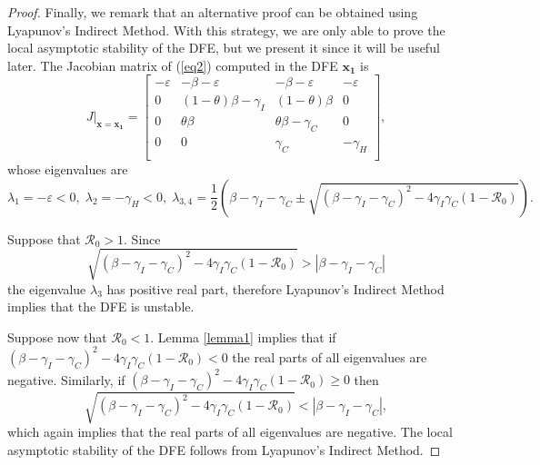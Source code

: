 \documentclass[11pt,reqno]{amsart}
\theoremstyle{boldremark}
\begin{document}
\begin{proof}
    Finally, we remark that an alternative proof can be obtained using Lyapunov's Indirect Method. With this strategy, we are only able to prove the local asymptotic stability of the DFE, but we present it since it will be useful later. The Jacobian matrix of (\ref{eq2}) computed in the DFE $\mathbf{x_1}$ is 
    \begin{equation*}
        J|_{\mathbf{x}=\mathbf{x_1}} = 
        \begin{bmatrix}
            -\varepsilon & -\beta-\varepsilon & -\beta-\varepsilon & -\varepsilon \\ 
            0 & (1-\theta)\beta-\gamma_I & (1-\theta)\beta & 0 \\ 
            0 & \theta \beta & \theta \beta - \gamma_C & 0 \\ 
            0 & 0 & \gamma_C & -\gamma_H \\ 
        \end{bmatrix},
    \end{equation*}
    whose eigenvalues are 
    \begin{equation*}
        \lambda_1 = -\varepsilon < 0, \; \lambda_2=-\gamma_H < 0, \; \lambda_{3,4} = \frac{1}{2} \left(\beta-\gamma_I-\gamma_C \pm \sqrt{(\beta-\gamma_I-\gamma_C)^2-4 \gamma_I \gamma_C(1-\mathcal{R}_0)}\right). 
    \end{equation*} 
    
    Suppose that $\mathcal{R}_0>1$. Since 
    \begin{equation*}
        \sqrt{(\beta-\gamma_I-\gamma_C)^2-4 \gamma_I \gamma_C(1-\mathcal{R}_0)} > |\beta-\gamma_I-\gamma_C|
    \end{equation*}
    the eigenvalue $\lambda_3$ has positive real part, therefore Lyapunov's Indirect Method implies that the DFE is unstable. 

    Suppose now that $\mathcal{R}_0<1$. Lemma \ref{lemma1} implies that if $(\beta-\gamma_I-\gamma_C)^2-4 \gamma_I \gamma_C(1-\mathcal{R}_0) < 0$ the real parts of all eigenvalues are negative. Similarly, if $(\beta-\gamma_I-\gamma_C)^2-4 \gamma_I \gamma_C(1-\mathcal{R}_0) \ge 0$ then 
    \begin{equation*}
        \sqrt{(\beta-\gamma_I-\gamma_C)^2-4 \gamma_I \gamma_C(1-\mathcal{R}_0)} < |\beta-\gamma_I-\gamma_C|, 
    \end{equation*}
    which again implies that the real parts of all eigenvalues are negative. The local asymptotic stability of the DFE follows from Lyapunov's Indirect Method. 
\end{proof}
\end{document}
